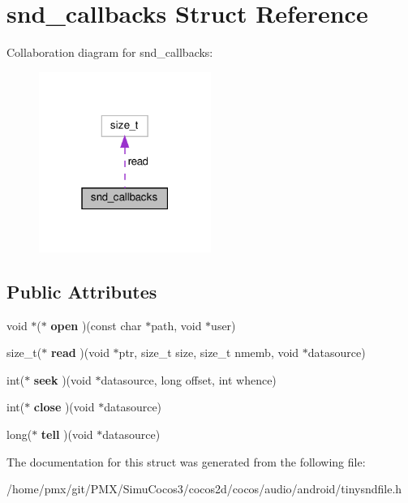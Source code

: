 \hypertarget{structsnd__callbacks}{}\section{snd\+\_\+callbacks Struct Reference}
\label{structsnd__callbacks}


Collaboration diagram for snd\+\_\+callbacks\+:
\nopagebreak
\begin{figure}[H]
\begin{center}
\leavevmode
\includegraphics[width=159pt]{structsnd__callbacks__coll__graph}
\end{center}
\end{figure}
\subsection*{Public Attributes}
\begin{DoxyCompactItemize}
\item 
\mbox{\label{structsnd__callbacks_a27a578558b6e0829cf8978bad088839b}} 
void $\ast$($\ast$ {\bfseries open} )(const char $\ast$path, void $\ast$user)
\item 
\mbox{\label{structsnd__callbacks_a45b4759b745e43fce3c85e465cdae029}} 
size\+\_\+t($\ast$ {\bfseries read} )(void $\ast$ptr, size\+\_\+t size, size\+\_\+t nmemb, void $\ast$datasource)
\item 
\mbox{\label{structsnd__callbacks_af1814b7cdad92d56bb4a94529949b1ec}} 
int($\ast$ {\bfseries seek} )(void $\ast$datasource, long offset, int whence)
\item 
\mbox{\label{structsnd__callbacks_a69983f0ec683a34ebd987456cbb0266e}} 
int($\ast$ {\bfseries close} )(void $\ast$datasource)
\item 
\mbox{\label{structsnd__callbacks_ac7bda863da4f500779d8ea3c7a3d1198}} 
long($\ast$ {\bfseries tell} )(void $\ast$datasource)
\end{DoxyCompactItemize}


The documentation for this struct was generated from the following file\+:\begin{DoxyCompactItemize}
\item 
/home/pmx/git/\+P\+M\+X/\+Simu\+Cocos3/cocos2d/cocos/audio/android/tinysndfile.\+h\end{DoxyCompactItemize}
